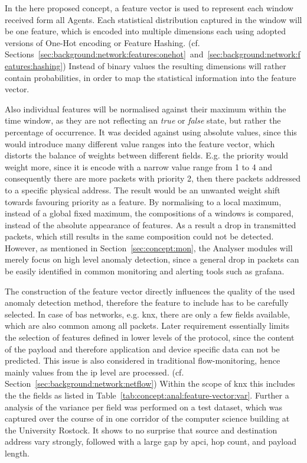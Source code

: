 In the here proposed concept, a feature vector is used to represent each window received form all Agents. Each statistical distribution captured in the window will be one feature, which is encoded into multiple dimensions each using adopted versions of One-Hot encoding or Feature Hashing. (cf. Sections~\ref{sec:background:network:features:onehot}~and~\ref{sec:background:network:features:hashing})
Instead of binary values the resulting dimensions will rather contain probabilities, in order to map the statistical information into the feature vector.

Also individual features will be normalised against their maximum within the time window, as they are not reflecting an \emph{true} or \emph{false} state, but rather the percentage of occurrence.
It was decided against using absolute values, since this would introduce many different value ranges into the feature vector, which distorts the balance of weights between different fields.
E.g. the priority would weight more, since it is encode with a narrow value range from 1 to 4 and consequently there are more packets with priority 2, then there packets addressed to a specific physical address. The result would be an unwanted weight shift towards favouring priority as a feature.
By normalising to a local maximum, instead of a global fixed maximum, the compositions of a windows is compared, instead of the absolute appearance of features.
As a result a drop in transmitted packets, which still results in the same composition could not be detected.
However, as mentioned in Section~\ref{sec:concept:mon}, the Analyser modules will merely focus on high level anomaly detection, since a general drop in packets can be easily identified in common monitoring and alerting tools such as \gls{grafana}.


The construction of the feature vector directly influences the quality of the used anomaly detection method, therefore the feature to include has to be carefully selected. In case of \gls{bas} networks, e.g. \gls{knx}, there are only a few fields available, which are also common among all packets. Later requirement essentially limits the selection of features defined in lower levels of the protocol, since the content of the payload and therefore application and device specific data can not be predicted.
This issue is also considered in traditional flow-monitoring, hence mainly values from the \gls{ip} level are processed. (cf. Section~\ref{sec:background:network:netflow})
Within the scope of \gls{knx} this includes the the fields as listed in Table~\ref{tab:concept:anal:feature-vector:var}. Further a analysis of the variance per field was performed on a test dataset, which was captured over the course of  in one corridor of the computer science building at the University Rostock.
It shows to no surprise that source and destination address vary strongly, followed with a large gap by \gls{apci}, hop count, and payload length. 

